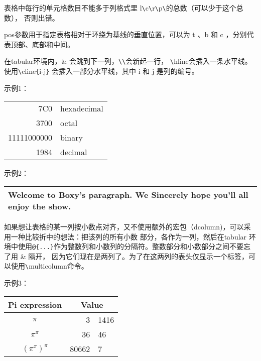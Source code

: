 \documentclass[UTF8]{ctexart}
\begin{document}
\qquad 表格中每行的单元格数目不能多于列格式里 l\texttt{\textbackslash}c\texttt{\textbackslash}r\texttt{\textbackslash}p\texttt{\textbackslash}的总数（可以少于这个总数），
否则出错。

\qquad pos参数用于指定表格相对于环绕为基线的垂直位置，可以为 t 、b 和 c ，分别代表顶部、底部和中间。

\qquad 在tabular环境内，\& 会跳到下一列，\texttt{\textbackslash}\texttt{\textbackslash}会新起一行，
\texttt{\textbackslash}hline会插入一条水平线。使用\texttt{\textbackslash}cline\texttt{\{}i-j\texttt{\}}
会插入一部分水平线，其中 i 和 j 是列的编号。
\newline

示例1：
\newline

\begin{tabular}{|r|l|}
\hline
7C0 & hexadecimal \\
3700 & octal \\ \cline{2-2}
11111000000 & binary \\
\hline \hline
1984 & decimal \\
\hline
\end{tabular}
\newline

示例2：
\newline

\begin{tabular}{|p{4.7cm}|}
\hline
Welcome to Boxy's paragraph.
We Sincerely hope you'll all enjoy the show.\\
\hline
\end{tabular}
\newline

\qquad 如果想让表格的某一列按小数点对齐，又不使用额外的宏包（dcolumn)，可以采用一种比较折中的想法：把该列的所有小数
部分，各作为一列，然后在tabular 环境中使用\texttt{@\{...\}}作为整数列和小数列的分隔符。整数部分和小数部分之间不要忘了用 \& 隔开，
因为它们现在是两列了。为了在这两列的表头仅显示一个标签，可以使用\texttt{\textbackslash}multicolumn命令。
\newline

示例3：
\newline

\begin{tabular}{c r @{.} l}
Pi expression       &
\multicolumn{2}{c}{Value} \\
\hline
$\pi$               & 3&1416 \\
$\pi^{\pi}$         & 36&46  \\
$(\pi^{\pi})^{\pi}$ & 80662&7 \\
\end{tabular}
\end{document}
